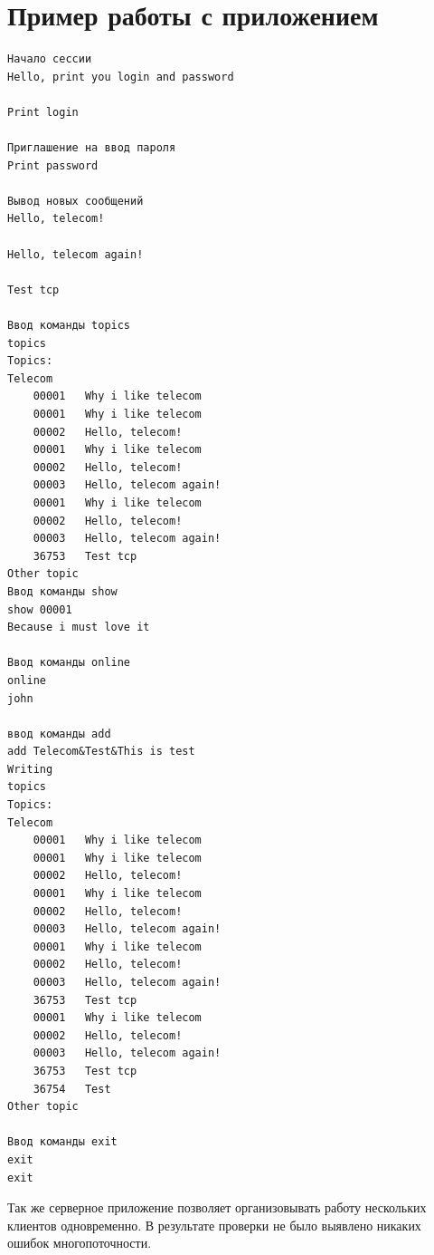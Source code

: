 \documentclass[10pt,a4paper]{report}
\begin{document}
\section{Пример работы с приложением}
\begin{verbatim}
Начало сессии
Hello, print you login and password

Print login

Приглашение на ввод пароля
Print password

Вывод новых сообщений
Hello, telecom!

Hello, telecom again!

Test tcp

Ввод команды topics
topics
Topics:
Telecom
	00001	Why i like telecom
	00001	Why i like telecom
	00002	Hello, telecom!
	00001	Why i like telecom
	00002	Hello, telecom!
	00003	Hello, telecom again!
	00001	Why i like telecom
	00002	Hello, telecom!
	00003	Hello, telecom again!
	36753	Test tcp
Other topic
Ввод команды show
show 00001
Because i must love it

Ввод команды online
online
john

ввод команды add
add Telecom&Test&This is test
Writing
topics
Topics:
Telecom
	00001	Why i like telecom
	00001	Why i like telecom
	00002	Hello, telecom!
	00001	Why i like telecom
	00002	Hello, telecom!
	00003	Hello, telecom again!
	00001	Why i like telecom
	00002	Hello, telecom!
	00003	Hello, telecom again!
	36753	Test tcp
	00001	Why i like telecom
	00002	Hello, telecom!
	00003	Hello, telecom again!
	36753	Test tcp
	36754	Test
Other topic

Ввод команды exit
exit
exit
\end{verbatim}
Так же серверное приложение позволяет организовывать работу нескольких клиентов одновременно. В результате проверки не было выявлено никаких ошибок многопоточности.
\end{document}
